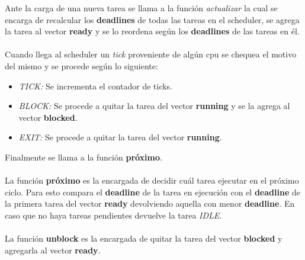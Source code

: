 Ante la carga de una nueva tarea se llama a la función \textit{actualizar} la cual se encarga de recalcular los \textbf{deadlines} de todas las tareas en el scheduler, se agrega la tarea al vector \textbf{ready} y se lo reordena según los \textbf{deadlines} de las tareas en él.\\
\\
Cuando llega al scheduler un \textit{tick} proveniente de algún cpu se chequea el motivo del mismo y se procede según lo siguiente:
\begin{itemize}
\item{\textit{TICK:} Se incrementa el contador de ticks.}
\item{\textit{BLOCK:} Se procede a quitar la tarea del vector \textbf{running} y se la agrega al vector \textbf{blocked}.}
\item{\textit{EXIT:} Se procede a quitar la tarea del vector \textbf{running}.}
\end{itemize}
Finalmente se llama a la función \textbf{próximo}.\\
\\
La función \textbf{próximo} es la encargada de decidir cuál tarea ejecutar en el próximo ciclo. Para esto compara el \textbf{deadline} de la tarea en ejecución con el \textbf{deadline} de la primera tarea del vector \textbf{ready} devolviendo aquella con menor \textbf{deadline}. En caso que no haya tareas pendientes devuelve la tarea \textit{IDLE}.\\
\\
La función \textbf{unblock} es la encargada de quitar la tarea del vector \textbf{blocked} y agregarla al vector \textbf{ready}.
 
 

